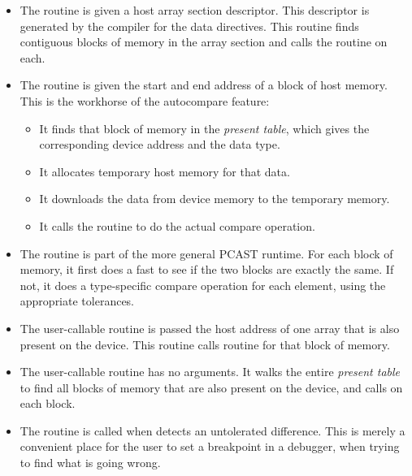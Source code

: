 \begin{itemize}
\item The  routine is given a host array section descriptor.
This descriptor is generated by the compiler for the data directives.
This routine finds contiguous blocks of memory in the array section and calls the  routine on each.
\item The  routine is given the start and end address of a block of host memory.
This is the workhorse of the autocompare feature:
\begin{itemize}
\item It finds that block of memory in the \emph{present table}, which gives the corresponding device address and the data type.
\item It allocates temporary host memory for that data.
\item It downloads the data from device memory to the temporary memory.
\item It calls the  routine to do the actual compare operation.
\end{itemize}
\item The  routine is part of the more general PCAST runtime.
For each block of memory, it first does a fast  to see if the two blocks are exactly the same.
If not, it does a type-specific compare operation for each element, using the appropriate tolerances.

\item The user-callable  routine is passed the host address of one array that is also present on the device.
This routine calls  routine for that block of memory. %
\item The user-callable  routine has no arguments.
It walks the entire \emph{present table} to find all blocks of memory that are also present on the device, and calls  on each block.
\item The  routine is called when  detects an untolerated difference.
This is merely a convenient place for the user to set a breakpoint in a debugger, when trying to find what is going wrong.
\end{itemize}

